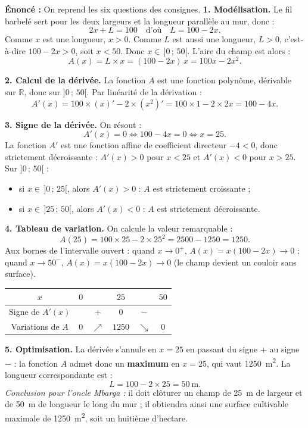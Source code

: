 \documentclass[11pt]{article}
\newcounter{popsec}
\newcounter{popsub}
\newcommand{\courssub}[1]{%
  \stepcounter{popsub}%
  \par\vspace{9pt}\noindent{\popxbold\fontsize{11.5}{13}\selectfont\color{popink}{\color{poporange}\thepopsec.\thepopsub}\hspace{6pt}#1}\par\nopagebreak\vspace{4pt}
}
\begin{document}
\courssub{Démarche et corrigé commenté}

\begin{exoresolu}
\textbf{Énoncé :} On reprend les six questions des consignes.
\tcblower
\textbf{1. Modélisation.} Le fil barbelé sert pour les deux largeurs et la longueur parallèle au mur, donc :
\[ 2x + L = 100 \quad \text{d'où} \quad L = 100 - 2x. \]
Comme $x$ est une longueur, $x > 0$. Comme $L$ est aussi une longueur, $L > 0$, c'est-à-dire $100 - 2x > 0$, soit $x < 50$. Donc $x \in \,]0\,;\,50[$. L'aire du champ est alors :
\[ A(x) = L \times x = (100 - 2x)\,x = 100x - 2x^2. \]

\textbf{2. Calcul de la dérivée.} La fonction $A$ est une fonction polynôme, dérivable sur $\mathbb{R}$, donc sur $]0\,;\,50[$. Par linéarité de la dérivation :
\[ A'(x) = 100 \times (x)' - 2 \times (x^2)' = 100 \times 1 - 2 \times 2x = 100 - 4x. \]

\textbf{3. Signe de la dérivée.} On résout :
\[ A'(x) = 0 \iff 100 - 4x = 0 \iff x = 25. \]
La fonction $A'$ est une fonction affine de coefficient directeur $-4 < 0$, donc strictement décroissante : $A'(x) > 0$ pour $x < 25$ et $A'(x) < 0$ pour $x > 25$. Sur $]0\,;\,50[$ :
\begin{itemize}
\item si $x \in \,]0\,;\,25[$, alors $A'(x) > 0$ : $A$ est strictement croissante ;
\item si $x \in \,]25\,;\,50[$, alors $A'(x) < 0$ : $A$ est strictement décroissante.
\end{itemize}

\textbf{4. Tableau de variation.} On calcule la valeur remarquable :
\[ A(25) = 100 \times 25 - 2 \times 25^2 = 2500 - 1250 = 1250. \]
Aux bornes de l'intervalle ouvert : quand $x \to 0^+$, $A(x) = x(100-2x) \to 0$ ; quand $x \to 50^-$, $A(x) = x(100-2x) \to 0$ (le champ devient un couloir sans surface).

\begin{center}
\begin{tabular}{|c|ccccc|}
\hline
\rowcolor{popblueL} $x$ & $0$ & & $25$ & & $50$ \\
\hline
Signe de $A'(x)$ & & $+$ & $0$ & $-$ & \\
\hline
Variations de $A$ & $0$ & $\nearrow$ & $1250$ & $\searrow$ & $0$ \\
\hline
\end{tabular}
\end{center}

\textbf{5. Optimisation.} La dérivée s'annule en $x = 25$ en passant du signe $+$ au signe $-$ : la fonction $A$ admet donc un \textbf{maximum} en $x = 25$, qui vaut \SI{1250}{m^2}. La longueur correspondante est :
\[ L = 100 - 2 \times 25 = 50 \ \text{m}. \]
\emph{Conclusion pour l'oncle Mbarga :} il doit clôturer un champ de \SI{25}{m} de largeur et de \SI{50}{m} de longueur le long du mur ; il obtiendra ainsi une surface cultivable maximale de \SI{1250}{m^2}, soit un huitième d'hectare.


\end{exoresolu}
\end{document}
